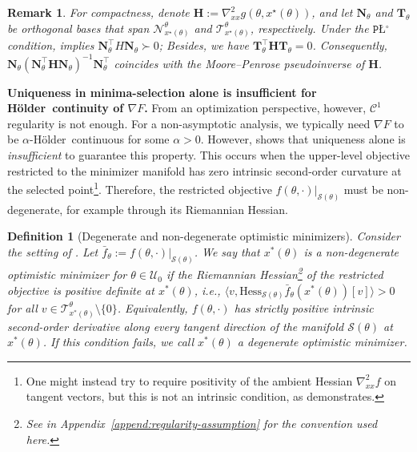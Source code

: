 \documentclass{article}
\theoremstyle{normaltheorem}
\newtheorem{remark}[remark]{Remark}
\newtheorem{definition}[definition]{Definition}
\newcommand{\PLcirc}{\texttt{P\L$^\circ$}}
\newcommand{\calS}{\mathcal{S}}
\newcommand{\calT}{\mathcal{T}}
\newcommand{\calN}{\mathcal{N}}
\newcommand{\holder}{{H\"older}}
\newcommand{\minimaselection}{{minima-selection}\xspace}
\begin{document}
\begin{remark} \label{remark_pseudoinverse}
For compactness, denote \(\mathbf{H}:=\nabla^{2}_{xx}g(\theta,x^\star(\theta))\), and let $\mathbf{N}_\theta$ and $\mathbf{T}_\theta$ be orthogonal bases that span \(\calN_{x^\star(\theta)}^\theta\) and \(\calT_{x^\star(\theta)}^\theta\), respectively.
Under the \(\PLcirc\) condition,  implies \(\mathbf{N}_\theta^\top H \mathbf{N}_\theta \succ 0\);
Besides, we have \(\mathbf{T}_\theta^\top \mathbf{H} \mathbf{T}_\theta = 0\).
Consequently, $\mathbf{N}_\theta\left(\mathbf{N}_\theta^\top \mathbf{H} \mathbf{N}_\theta\right)^{-1} \mathbf{N}_\theta^\top$ coincides with the Moore--Penrose pseudoinverse of $\mathbf{H}$.
\end{remark}


\textbf{Uniqueness in \minimaselection alone is insufficient for \holder\ continuity of $\nabla F$.}
From an optimization perspective, however, $\mathcal C^1$ regularity is not enough.
For a non-asymptotic analysis, we typically need $\nabla F$ to be $\alpha$-\holder\ continuous for some $\alpha > 0$.
However,  shows that uniqueness alone is \emph{insufficient} to guarantee this property.
This occurs when the upper-level objective restricted to the minimizer manifold has zero intrinsic second-order
curvature at the selected point\footnote{One might instead try to require positivity of the ambient Hessian \(\nabla^2_{xx}f\) on tangent vectors, but this is not
an intrinsic condition, as  demonstrates.}. Therefore, the restricted objective
\(f(\theta,\cdot)|_{\calS(\theta)}\) must be non-degenerate, for example through its Riemannian Hessian.

\begin{definition}[Degenerate and non-degenerate optimistic minimizers]\label{def:degenerate-optimistic}
Consider the setting of .
Let \(\bar f_\theta:=f(\theta,\cdot)|_{\calS(\theta)}\). We say that $x^*(\theta)$ is a
\emph{non-degenerate optimistic minimizer} for $\theta \in \mathcal{U}_0$ if the Riemannian Hessian\footnote{See
 in Appendix~\ref{append:regularity-assumption} for the convention used here.} of the restricted
objective is positive definite at \(x^*(\theta)\), i.e., $\big\langle v,\mathrm{Hess}_{\calS(\theta)}\bar f_\theta(x^*(\theta))[v]\big\rangle>0$ for all $v\in\calT_{x^*(\theta)}^{\theta}\setminus\{0\}$.
Equivalently, \(f(\theta,\cdot)\) has strictly positive intrinsic second-order derivative along every tangent direction
of the manifold \(\calS(\theta)\) at \(x^*(\theta)\).
If this condition fails, we call $x^*(\theta)$ a \emph{degenerate optimistic minimizer}. 
\end{definition}
\end{document}
